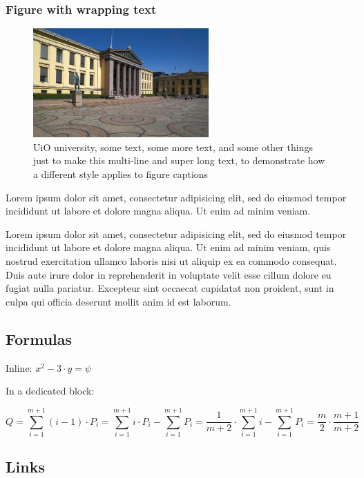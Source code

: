 \subsubsection{Figure with wrapping text}

\begin{figure}
    \begin{center}
        \includegraphics[width=0.6\textwidth]{./img/university-square-uio.jpg}
    \end{center}
    \caption{UiO university, some text, some more text, and some other things just to make this multi-line and super long text, to demonstrate how a different style applies to figure captions}
\end{figure}

Lorem ipsum dolor sit amet, consectetur adipisicing elit, sed do eiusmod tempor incididunt ut labore et dolore magna aliqua. Ut enim ad minim veniam.

Lorem ipsum dolor sit amet, consectetur adipisicing elit, sed do eiusmod tempor incididunt ut labore et dolore magna aliqua. Ut enim ad minim veniam, quis nostrud exercitation ullamco laboris nisi ut aliquip ex ea commodo consequat. Duis aute irure dolor in reprehenderit in voluptate velit esse cillum dolore eu fugiat nulla pariatur. Excepteur sint occaecat cupidatat non proident, sunt in culpa qui officia deserunt mollit anim id est laborum.

\subsection{Formulas}

Inline: $x^2 - 3\cdot y = \psi$

In a dedicated block:

$$Q = \sum_{i=1}^{m+1} (i - 1)\cdot P_i = \sum_{i=1}^{m+1} i\cdot P_i - \sum_{i=1}^{m+1} P_i = \frac{1}{m + 2}\cdot\sum_{i=1}^{m+1} i - \sum_{i=1}^{m+1} P_i = \frac{m}{2}\cdot\frac{m+1}{m+2}$$

\subsection{Links}

